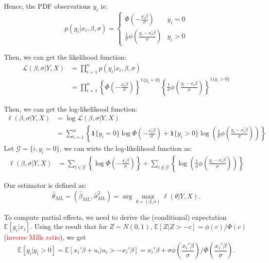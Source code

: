 Hence, the PDF observations $y_i$ is:
\[
p(y_i|x_i, \beta, \sigma) = \left\{\begin{matrix}
    \Phi\left(-\frac{x_i^{\prime} \beta}{\sigma}\right) & y_i = 0\\
    \frac{1}{\sigma} \phi\left(\frac{y_i - x_i^{\prime} \beta}{\sigma}\right) & y_i > 0
\end{matrix}\right.
\]

Then, we can get the likelihood function:
\begin{align*}
    \mathcal{L}(\beta, \sigma |Y, X) &= \prod_{i=1}^{n} p(y_i|x_i, \beta, \sigma)\\
    &= \prod_{i=1}^{n} \left\{\Phi\left(-\frac{x_i^{\prime} \beta}{\sigma}\right)\right\}^{1\{y_i=0\}} \left\{\frac{1}{\sigma} \phi\left(\frac{y_i - x_i^{\prime} \beta}{\sigma}\right)\right\}^{1\{y_i>0\}}
\end{align*}
    
Then, we can get the log-likelihood function:
\begin{align*}
    \ell(\beta, \sigma |Y, X) &= \log \mathcal{L}(\beta, \sigma | Y, X)\\
    &= \sum_{i=1}^{n} \left\{ \mathbf{1}\{y_i=0\} \log \Phi\left(-\frac{x_i^{\prime} \beta}{\sigma}\right) + \mathbf{1}\{y_i>0\} \log \left(\frac{1}{\sigma} \phi\left(\frac{y_i - x_i^{\prime} \beta}{\sigma}\right)\right)\right\}
\end{align*}
Let $\mathcal{G} = \{i, y_i = 0\}$, we can wirte the log-likelihood function as:
\begin{align*}
    \ell(\beta, \sigma |Y, X) &= \sum_{i \in \mathcal{G}} \left\{ \log \Phi\left(-\frac{x_i^{\prime} \beta}{\sigma}\right)\right\} + \sum_{i \notin \mathcal{G}} \left\{\log \left(\frac{1}{\sigma} \phi\left(\frac{y_i - x_i^{\prime} \beta}{\sigma}\right)\right)\right\}
\end{align*}

Our estimator is defined as: 
\[\hat{\theta}_{ML} = (\hat{\beta}_{ML} , \hat{\sigma}_{ML}^2 ) = \arg \max_{\theta = (\beta, \sigma)} \ell(\theta|Y, X).
\]

To compute partial effects, 
we need to derive the (conditional) expectation $\mathbb{E}[y_i|x_i].$ 
Using the result that for $Z\sim N(0,1)$, 
$\mathbb{E}[Z|Z>-c]=\phi(c)/\Phi(c)$ (\textcolor{red}{inverse Mills ratio}), we get
\[
\mathbb{E}[y_i|y_i>0]=\mathbb{E}[x_i'\beta+u_i|u_i>-x_i'\beta]=x_i'\beta+\sigma\phi\left(\frac{x_i'\beta}{\sigma}\right)/\Phi\left(\frac{x_i'\beta}{\sigma}\right).
\]


